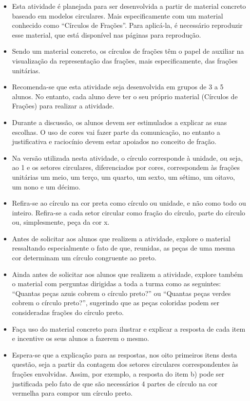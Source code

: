 \documentclass[10 pt,usenames,dvipsnames, oneside]{article}
\begin{document}
\begin{goals}
\begin{itemize}
\item    Esta atividade é planejada para ser desenvolvida a partir de material concreto baseado em modelos circulares. Mais especificamente com um material conhecido como ``Círculos de Frações''. Para aplicá-la, é necessário reproduzir esse material, que está disponível nas páginas para reprodução.
\item Sendo um material concreto, os círculos de frações têm o papel de auxiliar na visualização da representação das frações, mais especificamente, das frações unitárias.
\item Recomenda-se que esta atividade seja desenvolvida em grupos de 3 a 5 alunos. No entanto, cada aluno deve ter o seu próprio material (Círculos de Frações) para realizar a atividade.
\item Durante a discussão, os alunos devem ser estimulados a explicar as suas escolhas. O uso de cores vai fazer parte da comunicação, no entanto a justificativa e raciocínio devem estar apoiados no conceito de fração.
 \item Na versão utilizada nesta atividade, o círculo corresponde à unidade, ou seja, ao 1 e os setores circulares, diferenciados por cores, correspondem às frações unitárias um meio, um terço, um quarto, um sexto, um sétimo, um oitavo, um nono e um décimo.
    \item Refira-se ao círculo na cor preta como círculo ou unidade, e não como todo ou inteiro. Refira-se a cada setor circular como fração do círculo, parte do círculo ou, simplesmente, peça da cor x.
    \item Antes de solicitar aos alunos que realizem a atividade, explore o material ressaltando especialmente o fato de que, reunidas, as peças de uma mesma cor determinam um círculo congruente ao preto.
    \item Ainda antes de solicitar aos alunos que realizem a atividade, explore também o material com perguntas dirigidas a toda a turma como as seguintes: ``Quantas peças azuis cobrem o círculo preto?'' ou ``Quantas peças verdes cobrem o círculo preto?'', sugerindo que as peças coloridas podem ser consideradas frações do círculo preto.
    \item Faça uso do material concreto para ilustrar e explicar a resposta de cada item e incentive os seus alunos a fazerem o mesmo.
    \item Espera-se que a explicação para as respostas, nos oito primeiros itens desta questão, seja a partir da contagem dos setores circulares correspondentes às frações envolvidas. Assim, por exemplo, a resposta do item b) pode ser justificada pelo fato de que são necessários 4 partes de círculo na cor vermelha para compor um círculo preto.

\end{itemize}
\end{goals}
\end{document}
